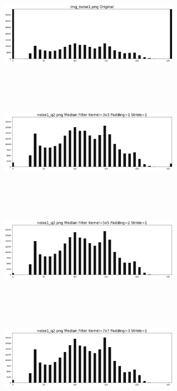 \documentclass[12pt,a4paper]{report}
\begin{document}
\begin{figure}[!htb]
  \begin{minipage}{\linewidth}
    \centering
    \begin{subfigure}{1\textwidth}
      \includegraphics[height=5.3cm]{result_img/noise1_his.png}
    \end{subfigure}
    \begin{subfigure}{1\textwidth}
      \includegraphics[height=5.3cm]{output/noise1_q2_K3P1_his.png}
    \end{subfigure}

    \begin{subfigure}{1\textwidth}
      \includegraphics[height=5.3cm]{output/noise1_q2_K5P2_his.png}
    \end{subfigure}
    \begin{subfigure}{1\textwidth}
      \includegraphics[height=5.3cm]{output/noise1_q2_K7P3_his.png}
    \end{subfigure}
    

\end{minipage}
\end{figure}
\end{document}
